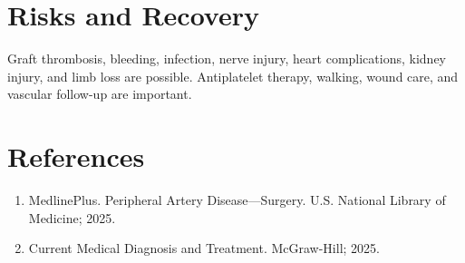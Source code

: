 \section*{Risks and Recovery}
Graft thrombosis, bleeding, infection, nerve injury, heart complications, kidney injury, and limb loss are possible. Antiplatelet therapy, walking, wound care, and vascular follow-up are important.
\section*{References}
\begin{enumerate}\item MedlinePlus. Peripheral Artery Disease---Surgery. U.S. National Library of Medicine; 2025.\item Current Medical Diagnosis and Treatment. McGraw-Hill; 2025.\end{enumerate}
\clearpage
